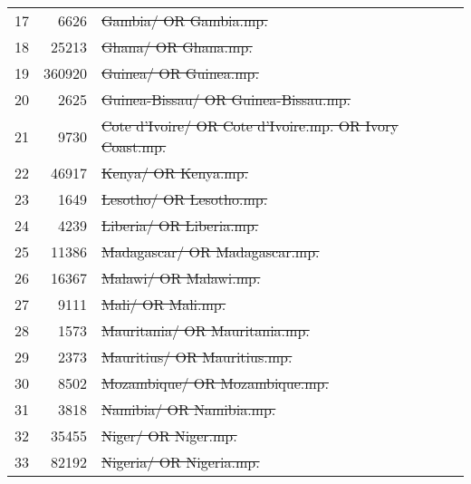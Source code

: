 \begin{tabular}{R{.01}R{.06}L{.84}}
	17 &   \num{6626} & \st{Gambia/ OR Gambia.mp.}                                                                \\
	18 &  \num{25213} & \st{Ghana/ OR Ghana.mp.}                                                                  \\
	19 & \num{360920} & \st{Guinea/ OR Guinea.mp.}                                                                \\
	20 &   \num{2625} & \st{Guinea-Bissau/ OR Guinea-Bissau.mp.}                                                  \\
	21 &   \num{9730} & \st{Cote d'Ivoire/ OR Cote d'Ivoire.mp. OR Ivory Coast.mp.}                               \\
	22 &  \num{46917} & \st{Kenya/ OR Kenya.mp.}                                                                  \\
	23 &   \num{1649} & \st{Lesotho/ OR Lesotho.mp.}                                                              \\
	24 &   \num{4239} & \st{Liberia/ OR Liberia.mp.}                                                              \\
	25 &  \num{11386} & \st{Madagascar/ OR Madagascar.mp.}                                                        \\
	26 &  \num{16367} & \st{Malawi/ OR Malawi.mp.}                                                                \\
	27 &   \num{9111} & \st{Mali/ OR Mali.mp.}                                                                    \\
	28 &   \num{1573} & \st{Mauritania/ OR Mauritania.mp.}                                                        \\
	29 &   \num{2373} & \st{Mauritius/ OR Mauritius.mp.}                                                          \\
	30 &   \num{8502} & \st{Mozambique/ OR Mozambique.mp.}                                                        \\
	31 &   \num{3818} & \st{Namibia/ OR Namibia.mp.}                                                              \\
	32 &  \num{35455} & \st{Niger/ OR Niger.mp.}                                                                  \\
	33 &  \num{82192} & \st{Nigeria/ OR Nigeria.mp.}                                                              \\

\end{tabular}
